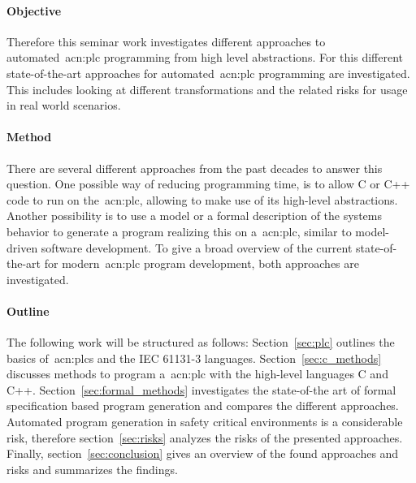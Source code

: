 \paragraph{Objective}
Therefore this seminar work investigates different approaches to automated~\gls{acn:plc} programming from high level abstractions.
For this different state-of-the-art approaches for automated~\gls{acn:plc} programming are investigated.
This includes looking at different transformations and the related risks for usage in real world scenarios.
\paragraph{Method}
There are several different approaches from the past decades to answer this question.
One possible way of reducing programming time, is to allow C or C++ code to run on the~\gls{acn:plc}, allowing to make use of its high-level abstractions.
Another possibility is to use a model or a formal description of the systems behavior to generate a program realizing this on a~\gls{acn:plc}, similar to model-driven software development.
To give a broad overview of the current state-of-the-art for modern~\gls{acn:plc} program development, both approaches are investigated.
\paragraph{Outline}
The following work will be structured as follows: 
Section~\ref{sec:plc} outlines the basics of~\glspl{acn:plc} and the IEC 61131-3 languages. 
Section~\ref{sec:c_methods} discusses methods to program a~\gls{acn:plc} with the high-level languages C and C++.
Section~\ref{sec:formal_methods} investigates the state-of-the art of formal specification based program generation and compares the different approaches.
Automated program generation in safety critical environments is a considerable risk, therefore section~\ref{sec:risks} analyzes the risks of the presented approaches.
Finally, section~\ref{sec:conclusion} gives an overview of the found approaches and risks and summarizes the findings.